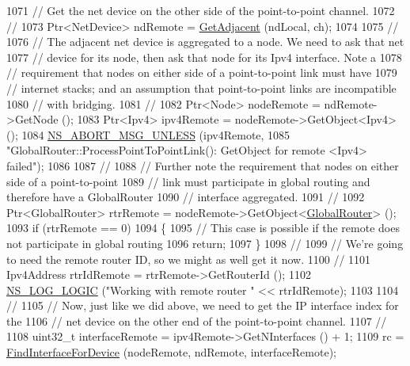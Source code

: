 \begin{DoxyCode}
1071   \textcolor{comment}{// Get the net device on the other side of the point-to-point channel.}
1072   \textcolor{comment}{//}
1073   Ptr<NetDevice> ndRemote = \hyperlink{classns3_1_1GlobalRouter_a347a9eb0edc5b923d6d3a3614e48769f}{GetAdjacent} (ndLocal, ch);
1074 
1075   \textcolor{comment}{//}
1076   \textcolor{comment}{// The adjacent net device is aggregated to a node.  We need to ask that net }
1077   \textcolor{comment}{// device for its node, then ask that node for its Ipv4 interface.  Note a}
1078   \textcolor{comment}{// requirement that nodes on either side of a point-to-point link must have }
1079   \textcolor{comment}{// internet stacks; and an assumption that point-to-point links are incompatible }
1080   \textcolor{comment}{// with bridging.}
1081   \textcolor{comment}{//}
1082   Ptr<Node> nodeRemote = ndRemote->GetNode ();
1083   Ptr<Ipv4> ipv4Remote = nodeRemote->GetObject<Ipv4> ();
1084   \hyperlink{group__fatal_ga0bd3f62c55e7347ff814572f3aaa3864}{NS\_ABORT\_MSG\_UNLESS} (ipv4Remote, 
1085                        \textcolor{stringliteral}{"GlobalRouter::ProcessPointToPointLink(): GetObject for remote <Ipv4> failed"});
1086 
1087   \textcolor{comment}{//}
1088   \textcolor{comment}{// Further note the requirement that nodes on either side of a point-to-point }
1089   \textcolor{comment}{// link must participate in global routing and therefore have a GlobalRouter}
1090   \textcolor{comment}{// interface aggregated.}
1091   \textcolor{comment}{//}
1092   Ptr<GlobalRouter> rtrRemote = nodeRemote->GetObject<\hyperlink{classns3_1_1GlobalRouter_a778050c70fe491c0fe62b7cf6b10aaf6}{GlobalRouter}> ();
1093   \textcolor{keywordflow}{if} (rtrRemote == 0)
1094     \{
1095       \textcolor{comment}{// This case is possible if the remote does not participate in global routing}
1096       \textcolor{keywordflow}{return};
1097     \}
1098   \textcolor{comment}{//}
1099   \textcolor{comment}{// We're going to need the remote router ID, so we might as well get it now.}
1100   \textcolor{comment}{//}
1101   Ipv4Address rtrIdRemote = rtrRemote->GetRouterId ();
1102   \hyperlink{group__logging_ga88acd260151caf2db9c0fc84997f45ce}{NS\_LOG\_LOGIC} (\textcolor{stringliteral}{"Working with remote router "} << rtrIdRemote);
1103 
1104   \textcolor{comment}{//}
1105   \textcolor{comment}{// Now, just like we did above, we need to get the IP interface index for the }
1106   \textcolor{comment}{// net device on the other end of the point-to-point channel.}
1107   \textcolor{comment}{//}
1108   uint32\_t interfaceRemote = ipv4Remote->GetNInterfaces () + 1;
1109   rc = \hyperlink{classns3_1_1GlobalRouter_a7b30c3c09f93e3f3ac7cfe787b51d127}{FindInterfaceForDevice} (nodeRemote, ndRemote, interfaceRemote);

\end{DoxyCode}
